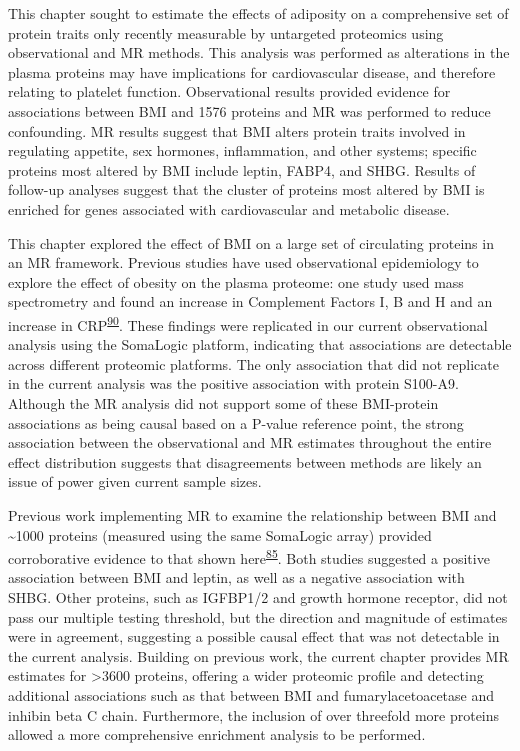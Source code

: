\documentclass[11pt,twoside]{bristolthesis}
\begin{document}
This chapter sought to estimate the effects of adiposity on a comprehensive set of protein traits only recently measurable by untargeted proteomics using observational and MR methods. This analysis was performed as alterations in the plasma proteins may have implications for cardiovascular disease, and therefore relating to platelet function. Observational results provided evidence for associations between BMI and 1576 proteins and MR was performed to reduce confounding. MR results suggest that BMI alters protein traits involved in regulating appetite, sex hormones, inflammation, and other systems; specific proteins most altered by BMI include leptin, FABP4, and SHBG. Results of follow-up analyses suggest that the cluster of proteins most altered by BMI is enriched for genes associated with cardiovascular and metabolic disease.

This chapter explored the effect of BMI on a large set of circulating proteins in an MR framework. Previous studies have used observational epidemiology to explore the effect of obesity on the plasma proteome: one study used mass spectrometry and found an increase in Complement Factors I, B and H and an increase in CRP\textsuperscript{\protect\hyperlink{ref-Cominetti2018}{90}}. These findings were replicated in our current observational analysis using the SomaLogic platform, indicating that associations are detectable across different proteomic platforms. The only association that did not replicate in the current analysis was the positive association with protein S100-A9. Although the MR analysis did not support some of these BMI-protein associations as being causal based on a P-value reference point, the strong association between the observational and MR estimates throughout the entire effect distribution suggests that disagreements between methods are likely an issue of power given current sample sizes.

Previous work implementing MR to examine the relationship between BMI and \textasciitilde1000 proteins (measured using the same SomaLogic array) provided corroborative evidence to that shown here\textsuperscript{\protect\hyperlink{ref-Zaghlool2021}{85}}. Both studies suggested a positive association between BMI and leptin, as well as a negative association with SHBG. Other proteins, such as IGFBP1/2 and growth hormone receptor, did not pass our multiple testing threshold, but the direction and magnitude of estimates were in agreement, suggesting a possible causal effect that was not detectable in the current analysis. Building on previous work, the current chapter provides MR estimates for \textgreater3600 proteins, offering a wider proteomic profile and detecting additional associations such as that between BMI and fumarylacetoacetase and inhibin beta C chain. Furthermore, the inclusion of over threefold more proteins allowed a more comprehensive enrichment analysis to be performed.
\end{document}
